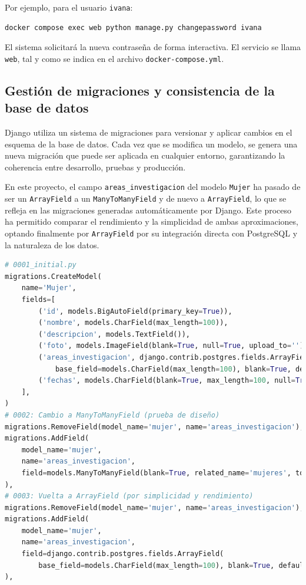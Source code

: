Por ejemplo, para el usuario \texttt{ivana}:

\begin{lstlisting}[language=bash]
docker compose exec web python manage.py changepassword ivana
\end{lstlisting}

El sistema solicitará la nueva contraseña de forma interactiva.  
El servicio se llama \texttt{web}, tal y como se indica en el archivo \texttt{docker-compose.yml}.

\subsection{Gestión de migraciones y consistencia de la base de datos}

Django utiliza un sistema de migraciones para versionar y aplicar cambios en el esquema de la base de datos. Cada vez que se modifica un modelo, se genera una nueva migración que puede ser aplicada en cualquier entorno, garantizando la coherencia entre desarrollo, pruebas y producción.

En este proyecto, el campo \texttt{areas\_investigacion} del modelo \texttt{Mujer} ha pasado de ser un \texttt{ArrayField} a un \texttt{ManyToManyField} y de nuevo a \texttt{ArrayField}, lo que se refleja en las migraciones generadas automáticamente por Django. Este proceso ha permitido comparar el rendimiento y la simplicidad de ambas aproximaciones, optando finalmente por \texttt{ArrayField} por su integración directa con PostgreSQL y la naturaleza de los datos.

\begin{lstlisting}[language=Python, caption={Fragmento de migraciones reales}]
# 0001_initial.py
migrations.CreateModel(
    name='Mujer',
    fields=[
        ('id', models.BigAutoField(primary_key=True)),
        ('nombre', models.CharField(max_length=100)),
        ('descripcion', models.TextField()),
        ('foto', models.ImageField(blank=True, null=True, upload_to='')),
        ('areas_investigacion', django.contrib.postgres.fields.ArrayField(
            base_field=models.CharField(max_length=100), blank=True, default=list, verbose_name='Áreas de investigación')),
        ('fechas', models.CharField(blank=True, max_length=100, null=True)),
    ],
)
# 0002: Cambio a ManyToManyField (prueba de diseño)
migrations.RemoveField(model_name='mujer', name='areas_investigacion'),
migrations.AddField(
    model_name='mujer',
    name='areas_investigacion',
    field=models.ManyToManyField(blank=True, related_name='mujeres', to='mujeres.areainvestigacion'),
),
# 0003: Vuelta a ArrayField (por simplicidad y rendimiento)
migrations.RemoveField(model_name='mujer', name='areas_investigacion'),
migrations.AddField(
    model_name='mujer',
    name='areas_investigacion',
    field=django.contrib.postgres.fields.ArrayField(
        base_field=models.CharField(max_length=100), blank=True, default=list, verbose_name='Áreas de investigación'),
),
\end{lstlisting}

